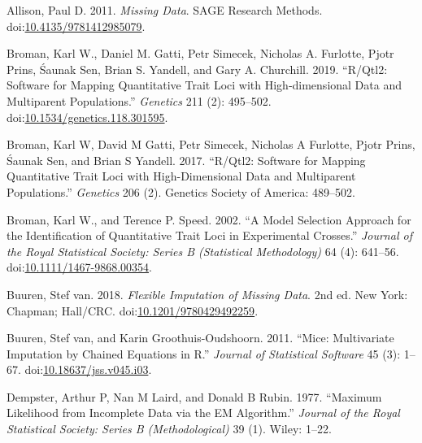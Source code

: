 \documentclass[
  12pt,
]{article}
\newlength{\cslhangindent}
\newlength{\cslentryspacingunit} %
\newenvironment{CSLReferences}[2] %
 {%
  \setlength{\parindent}{0pt}
  \ifodd #1
  \let\oldpar\par
  \def\par{\hangindent=\cslhangindent\oldpar}
  \fi
  \setlength{\parskip}{#2\cslentryspacingunit}
 }%
 {}
\begin{document}
\hypertarget{refs}{}
\begin{CSLReferences}{1}{0}
\leavevmode{}%
Allison, Paul D. 2011. \emph{Missing Data}. SAGE Research Methods.
doi:\href{https://doi.org/10.4135/9781412985079}{10.4135/9781412985079}.

\leavevmode{}%
Broman, Karl W., Daniel M. Gatti, Petr Simecek, Nicholas A. Furlotte,
Pjotr Prins, Śaunak Sen, Brian S. Yandell, and Gary A. Churchill. 2019.
{``R/Qtl2: Software for Mapping Quantitative Trait Loci with
High‑dimensional Data and Multiparent Populations.''} \emph{Genetics}
211 (2): 495--502.
doi:\href{https://doi.org/10.1534/genetics.118.301595}{10.1534/genetics.118.301595}.

\leavevmode{}%
Broman, Karl W, David M Gatti, Petr Simecek, Nicholas A Furlotte, Pjotr
Prins, Śaunak Sen, and Brian S Yandell. 2017. {``R/Qtl2: Software for
Mapping Quantitative Trait Loci with High-Dimensional Data and
Multiparent Populations.''} \emph{Genetics} 206 (2). Genetics Society of
America: 489--502.

\leavevmode{}%
Broman, Karl W., and Terence P. Speed. 2002. {``A Model Selection
Approach for the Identification of Quantitative Trait Loci in
Experimental Crosses.''} \emph{Journal of the Royal Statistical Society:
Series B (Statistical Methodology)} 64 (4): 641--56.
doi:\href{https://doi.org/10.1111/1467-9868.00354}{10.1111/1467-9868.00354}.

\leavevmode{}%
Buuren, Stef van. 2018. \emph{Flexible Imputation of Missing Data}. 2nd
ed. New York: Chapman; Hall/CRC.
doi:\href{https://doi.org/10.1201/9780429492259}{10.1201/9780429492259}.

\leavevmode{}%
Buuren, Stef van, and Karin Groothuis-Oudshoorn. 2011. {``Mice:
Multivariate Imputation by Chained Equations in {R}.''} \emph{Journal of
Statistical Software} 45 (3): 1--67.
doi:\href{https://doi.org/10.18637/jss.v045.i03}{10.18637/jss.v045.i03}.

\leavevmode{}%
Dempster, Arthur P, Nan M Laird, and Donald B Rubin. 1977. {``Maximum
Likelihood from Incomplete Data via the EM Algorithm.''} \emph{Journal
of the Royal Statistical Society: Series B (Methodological)} 39 (1).
Wiley: 1--22.


\end{CSLReferences}
\end{document}
